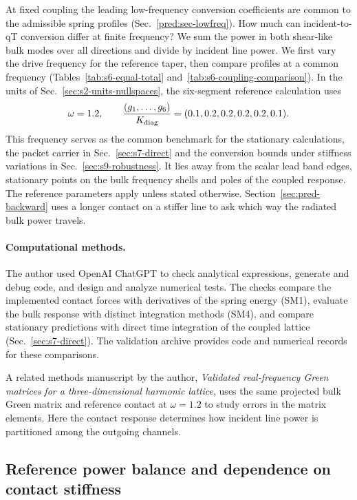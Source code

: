 \documentclass[10pt,aps,onecolumn,floatfix,notitlepage,nofootinbib,showkeys]{revtex4-2}
\begin{document}
At fixed coupling the leading low-frequency conversion coefficients are common to the admissible spring profiles (Sec.~\ref{pred:sec-lowfreq}). How much can incident-to-qT conversion differ at finite frequency? We sum the power in both shear-like bulk modes over all directions and divide by incident line power. We first vary the drive frequency for the reference taper, then compare profiles at a common frequency (Tables~\ref{tab:s6-equal-total} and~\ref{tab:s6-coupling-comparison}). In the units of Sec.~\ref{sec:s2-units-nullspaces}, the six-segment reference calculation uses
\begin{equation}
 \omega=1.2,
 \qquad
 \frac{(g_1,\ldots,g_6)}{K_{\rm diag}}
 =(0.1,0.2,0.2,0.2,0.2,0.1).
 \label{eq:s6-reference-point}
\end{equation}
This frequency serves as the common benchmark for the stationary calculations, the packet carrier in Sec.~\ref{sec:s7-direct} and the conversion bounds under stiffness variations in Sec.~\ref{sec:s9-robustness}. It lies away from the scalar lead band edges, stationary points on the bulk frequency shells and poles of the coupled response. The reference parameters apply unless stated otherwise. Section~\ref{sec:pred-backward} uses a longer contact on a stiffer line to ask which way the radiated bulk power travels.

\paragraph*{Computational methods.}
The author used OpenAI ChatGPT to check analytical expressions, generate and debug code, and design and analyze numerical tests. The checks compare the implemented contact forces with derivatives of the spring energy (SM1), evaluate the bulk response with distinct integration methods (SM4), and compare stationary predictions with direct time integration of the coupled lattice (Sec.~\ref{sec:s7-direct}). The validation archive provides code and numerical records for these comparisons.

A related methods manuscript by the author, \emph{Validated real-frequency Green matrices for a three-dimensional harmonic lattice}, uses the same projected bulk Green matrix and reference contact at $\omega=1.2$ to study errors in the matrix elements. Here the contact response determines how incident line power is partitioned among the outgoing channels.

\subsection{Reference power balance and dependence on contact stiffness}
\label{sec:s6-reference}
\end{document}
